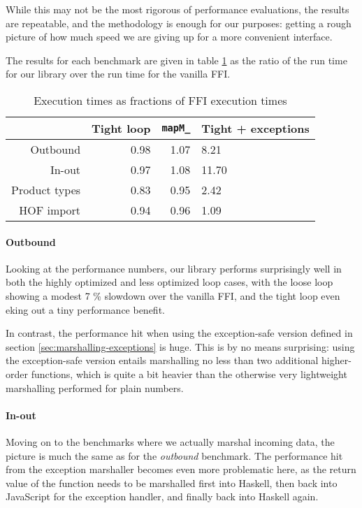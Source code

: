 \documentclass[preprint]{sigplanconf}
\begin{document}
While this may not be the most rigorous of performance evaluations,
the results are repeatable, and the methodology is enough for our purposes:
getting a rough picture of how much speed we are giving up for a more
convenient interface.

The results for each benchmark are given in table \ref{tbl:performance} as
the ratio of the run time for our library over the run time for the vanilla
FFI.

\begin{table}
  \renewcommand{\arraystretch}{1.5}
  \begin{center}
    \begin{tabular}{|r|r|r|l|}
      \hline
                    & Tight loop & \lstinline!mapM_! & Tight + exceptions\\
      \hline
      Outbound      & 0.98       & 1.07              & 8.21\\
      \hline
      In-out        & 0.97       & 1.08              & 11.70\\
      \hline
      Product types & 0.83       & 0.95              & 2.42\\
      \hline
      HOF import    & 0.94       & 0.96              & 1.09\\
      \hline
    \end{tabular}
  \end{center}
  \caption{Execution times as fractions of FFI execution times}
  \label{tbl:performance}
\end{table}

\paragraph{Outbound}
Looking at the performance numbers, our library performs surprisingly well in
both the highly optimized and less optimized loop cases, with the loose loop
showing a modest 7 \% slowdown over the vanilla FFI, and the tight loop even
eking out a tiny performance benefit.

In contrast, the performance hit when using the exception-safe version defined
in section \ref{sec:marshalling-exceptions} is huge.
This is by no means surprising: using the exception-safe version entails
marshalling no less than two additional higher-order functions, which is quite
a bit heavier than the otherwise very lightweight marshalling performed for
plain numbers.

\paragraph{In-out}
Moving on to the benchmarks where we actually marshal incoming data, the
picture is much the same as for the \emph{outbound} benchmark. The performance
hit from the exception marshaller becomes even more problematic here, as the
return value of the function needs to be marshalled first into Haskell,
then back into JavaScript for the exception handler, and finally back into
Haskell again.
\end{document}
